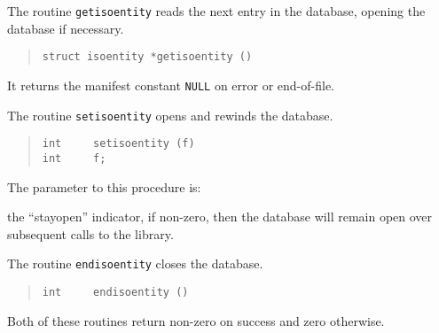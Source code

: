 The routine \verb"getisoentity" reads the next entry in the database,
opening the database if necessary.
\begin{quote}\small\begin{verbatim}
struct isoentity *getisoentity ()
\end{verbatim}\end{quote}
It returns the manifest constant \verb"NULL" on error or end-of-file.

The routine \verb"setisoentity" opens and rewinds the database.
\begin{quote}\small\begin{verbatim}
int     setisoentity (f)
int     f;
\end{verbatim}\end{quote}
The parameter to this procedure is:
\begin{describe}
\item[\verb"f":] the ``stayopen'' indicator,
if non-zero, then the database will remain open over subsequent calls to the
library.
\end{describe}
The routine \verb"endisoentity" closes the database.
\begin{quote}\small\begin{verbatim}
int     endisoentity ()
\end{verbatim}\end{quote}
Both of these routines return non-zero on success and zero otherwise.

